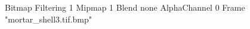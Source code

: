 {Bitmap
	{Filtering 1}
	{Mipmap 1}
	{Blend none}
	{AlphaChannel 0}
	{Frame "mortar_shell3.tif.bmp"}
}
